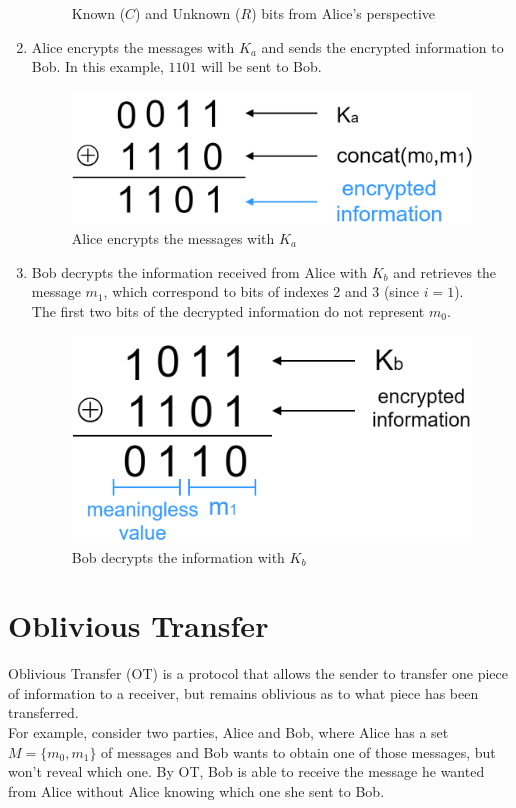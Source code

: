 \begin{enumerate}
\begin{figure}[H]
\caption{Known ($C$) and Unknown ($R$) bits from Alice's perspective }
\label{fig:knownalice}
\end{figure}
\item Alice encrypts the messages with $K_a$ and sends the encrypted information to Bob. In this example, $1101$ will be sent to Bob.
\renewcommand{\figurename}{Figure}
\begin{figure}[H]
\centering
\includegraphics[width=.4\linewidth]{./figures/mpc/mpc_message_encrypting}
\caption{Alice encrypts the messages with $K_a$}
\label{fig:mpcencryption}
\end{figure}
\item Bob decrypts the information received from Alice with $K_b$ and retrieves the message $m_1$, which correspond to bits of indexes 2 and 3 (since $i=1$).\\
The first two bits of the decrypted information do not represent $m_0$.
\renewcommand{\figurename}{Figure}
\begin{figure}[H]
\centering
\includegraphics[width=.4\linewidth]{./figures/mpc/mpc_message_decrypting}
\caption{Bob decrypts the information with $K_b$}
\label{fig:mpcdecryption}
\end{figure}
\end{enumerate}

\section{Oblivious Transfer}
Oblivious Transfer (OT) is a protocol that allows the sender to transfer one piece of information
to a receiver, but remains oblivious as to what piece has been transferred.\\
For example, consider two parties, Alice and Bob, where Alice has a set $M = \{m_0,m_1\}$ of messages
and Bob wants to obtain one of those messages, but won't reveal which one. By OT, Bob is able to
receive the message he wanted from Alice without Alice knowing which one she sent to Bob.

